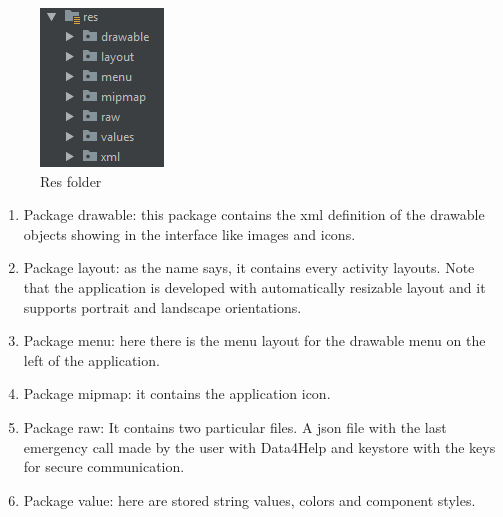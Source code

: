 \begin{figure}[H]
\includegraphics[width=\linewidth]{images/Res.png}
\caption{ Res folder }
\label{fig:pkgsharedata}
\end{figure}

\begin{enumerate}
\item Package drawable: this package contains the xml definition of the drawable objects showing in the interface like images and icons.
\item Package layout: as the name says, it contains every activity layouts. Note that the application is developed with automatically resizable layout and it supports portrait and landscape orientations.
\item Package menu: here there is the menu layout for the drawable menu on the left of the application.
\item Package mipmap: it contains the application icon.
\item Package raw: It contains two particular files. A json file with the last emergency call made by the user with Data4Help and keystore with the keys for secure communication.
\item Package value: here are stored string values, colors and component styles. 
\end{enumerate}

